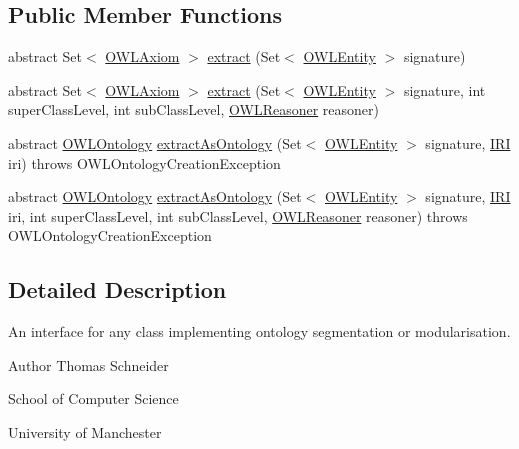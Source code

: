 \subsection*{Public Member Functions}
\begin{DoxyCompactItemize}
\item 
abstract Set$<$ \hyperlink{interfaceorg_1_1semanticweb_1_1owlapi_1_1model_1_1_o_w_l_axiom}{O\-W\-L\-Axiom} $>$ \hyperlink{interfaceorg_1_1semanticweb_1_1owlapi_1_1modularity_1_1_ontology_segmenter_a8e3b4e90d545a002e6f7ddc8e7fb7ab8}{extract} (Set$<$ \hyperlink{interfaceorg_1_1semanticweb_1_1owlapi_1_1model_1_1_o_w_l_entity}{O\-W\-L\-Entity} $>$ signature)
\item 
abstract Set$<$ \hyperlink{interfaceorg_1_1semanticweb_1_1owlapi_1_1model_1_1_o_w_l_axiom}{O\-W\-L\-Axiom} $>$ \hyperlink{interfaceorg_1_1semanticweb_1_1owlapi_1_1modularity_1_1_ontology_segmenter_af3302f1174e01b55096aeea8e0e1e8a1}{extract} (Set$<$ \hyperlink{interfaceorg_1_1semanticweb_1_1owlapi_1_1model_1_1_o_w_l_entity}{O\-W\-L\-Entity} $>$ signature, int super\-Class\-Level, int sub\-Class\-Level, \hyperlink{interfaceorg_1_1semanticweb_1_1owlapi_1_1reasoner_1_1_o_w_l_reasoner}{O\-W\-L\-Reasoner} reasoner)
\item 
abstract \hyperlink{interfaceorg_1_1semanticweb_1_1owlapi_1_1model_1_1_o_w_l_ontology}{O\-W\-L\-Ontology} \hyperlink{interfaceorg_1_1semanticweb_1_1owlapi_1_1modularity_1_1_ontology_segmenter_a08f49bbb7a8b29c588b13dbcf6243efc}{extract\-As\-Ontology} (Set$<$ \hyperlink{interfaceorg_1_1semanticweb_1_1owlapi_1_1model_1_1_o_w_l_entity}{O\-W\-L\-Entity} $>$ signature, \hyperlink{classorg_1_1semanticweb_1_1owlapi_1_1model_1_1_i_r_i}{I\-R\-I} iri)  throws O\-W\-L\-Ontology\-Creation\-Exception
\item 
abstract \hyperlink{interfaceorg_1_1semanticweb_1_1owlapi_1_1model_1_1_o_w_l_ontology}{O\-W\-L\-Ontology} \hyperlink{interfaceorg_1_1semanticweb_1_1owlapi_1_1modularity_1_1_ontology_segmenter_a38578d60c70fe4364e0fce8a6a64ce7c}{extract\-As\-Ontology} (Set$<$ \hyperlink{interfaceorg_1_1semanticweb_1_1owlapi_1_1model_1_1_o_w_l_entity}{O\-W\-L\-Entity} $>$ signature, \hyperlink{classorg_1_1semanticweb_1_1owlapi_1_1model_1_1_i_r_i}{I\-R\-I} iri, int super\-Class\-Level, int sub\-Class\-Level, \hyperlink{interfaceorg_1_1semanticweb_1_1owlapi_1_1reasoner_1_1_o_w_l_reasoner}{O\-W\-L\-Reasoner} reasoner)  throws O\-W\-L\-Ontology\-Creation\-Exception
\end{DoxyCompactItemize}


\subsection{Detailed Description}
An interface for any class implementing ontology segmentation or modularisation. \begin{DoxyAuthor}{Author}
Thomas Schneider 

School of Computer Science 

University of Manchester 
\end{DoxyAuthor}


